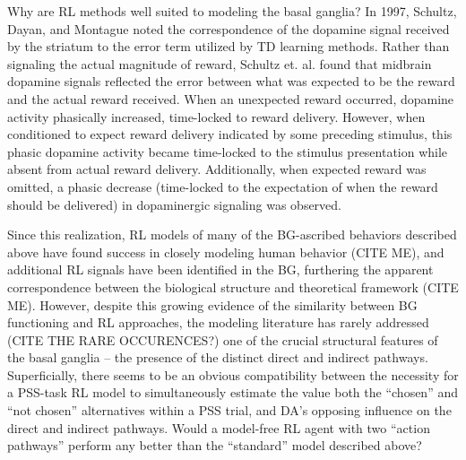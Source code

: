 \documentclass[10pt,letterpaper]{article}
\begin{document}
Why are RL methods well suited to modeling the basal ganglia? In 1997, Schultz, Dayan, and Montague noted the correspondence of the dopamine signal received by the striatum to the error term utilized by TD learning methods. Rather than signaling the actual magnitude of reward, Schultz et. al. found that midbrain dopamine signals reflected the error between what was expected to be the reward and the actual reward received. When an unexpected reward occurred, dopamine activity phasically increased, time-locked to reward delivery. However, when conditioned to expect reward delivery indicated by some preceding stimulus, this phasic dopamine activity became time-locked to the stimulus presentation while absent from actual reward delivery. Additionally, when expected reward was omitted, a phasic decrease (time-locked to the expectation of when the reward should be delivered) in dopaminergic signaling was observed. 

Since this realization, RL models of many of the BG-ascribed behaviors described above have found success in closely modeling human behavior (CITE ME), and additional RL signals have been identified in the BG, furthering the apparent correspondence between the biological structure and theoretical framework (CITE ME). However, despite this growing evidence of the similarity between BG functioning and RL approaches, the modeling literature has rarely addressed (CITE THE RARE OCCURENCES?) one of the crucial structural features of the basal ganglia – the presence of the distinct direct and indirect pathways. Superficially, there seems to be an obvious compatibility between the necessity for a PSS-task RL model to simultaneously estimate the value both the “chosen” and “not chosen” alternatives within a PSS trial, and DA’s opposing influence on the direct and indirect pathways. Would a model-free RL agent with two “action pathways” perform any better than the “standard” model described above?
\end{document}
